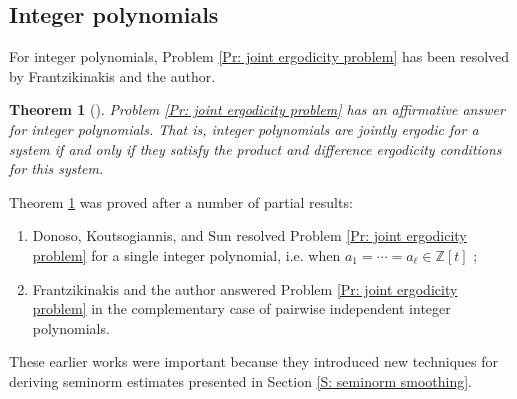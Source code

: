 \documentclass[11pt]{amsart}
\newtheorem{theorem}[lemma]{Theorem}
\theoremstyle{definition}
\newcommand{\Z}{{\mathbb Z}}
\newcommand{\1}{{\mathbf{1}}}
\begin{document}
\subsection{Integer polynomials}
    For integer polynomials, Problem \ref{Pr: joint ergodicity problem} has been resolved by Frantzikinakis and the author. %
    \begin{theorem}[{\cite{FrKu22b}}]\label{T: FrKu classification problem}
        Problem \ref{Pr: joint ergodicity problem} has an affirmative answer for integer polynomials. That is, integer polynomials are jointly ergodic for a system if and only if they satisfy the product and difference ergodicity conditions for this system.
    \end{theorem}
    Theorem \ref{T: FrKu classification problem} was proved after a number of partial results:
    \begin{enumerate}
        \item Donoso, Koutsogiannis, and Sun resolved Problem \ref{Pr: joint ergodicity problem} for a single integer polynomial, i.e. when $a_1 = \cdots = a_\ell\in\Z[t]$ \cite{DKS22};
        \item Frantzikinakis and the author \cite{FrKu22a} answered Problem \ref{Pr: joint ergodicity problem} in the complementary case of pairwise independent integer polynomials.
    \end{enumerate}
These earlier works
were important because they introduced new techniques for deriving seminorm estimates presented in Section \ref{S: seminorm smoothing}. 
\end{document}
